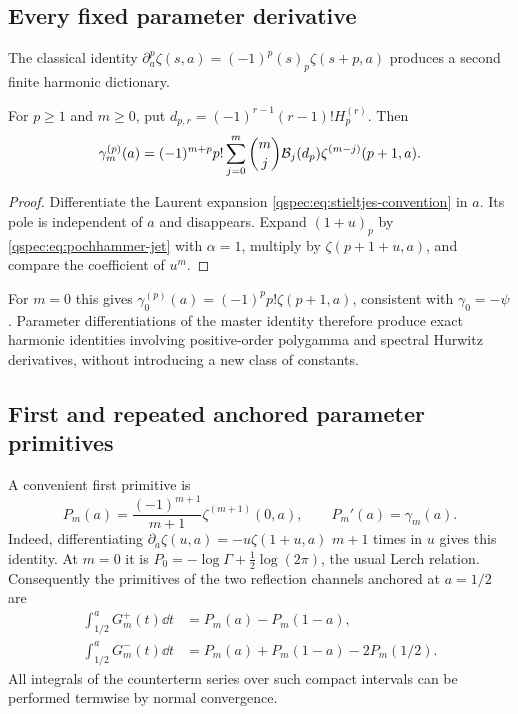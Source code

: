 \subsection{Every fixed parameter derivative}
The classical identity
$\partial_a^p\zeta(s,a)=(-1)^p(s)_p\zeta(s+p,a)$ \cite{hurwitz}
produces a second finite harmonic dictionary.

\begin{proposition}\label{qspec:prop:parameter-derivatives}
For $p\ge1$ and $m\ge0$, put
$d_{p,r}=(-1)^{r-1}(r-1)!H_p^{(r)}$. Then
\begin{equation}\label{qspec:eq:stieltjes-derivative}
\gamma_m^{(p)}(a)=(-1)^{m+p}p!
\sum_{j=0}^m\binom mj\mathcal B_j(d_p)
\zeta^{(m-j)}(p+1,a).
\end{equation}
\end{proposition}
\begin{proof}
Differentiate the Laurent expansion
\eqref{qspec:eq:stieltjes-convention} in $a$. Its pole is independent of
$a$ and disappears. Expand $(1+u)_p$ by
\eqref{qspec:eq:pochhammer-jet} with $\alpha=1$, multiply by
$\zeta(p+1+u,a)$, and compare the coefficient of $u^m$.
\end{proof}
For $m=0$ this gives $\gamma_0^{(p)}(a)=(-1)^pp!\zeta(p+1,a)$,
consistent with $\gamma_0=-\psi$. Parameter differentiations of the
master identity therefore produce exact harmonic identities involving
positive-order polygamma and spectral Hurwitz derivatives, without
introducing a new class of constants.

\subsection{First and repeated anchored parameter primitives}
A convenient first primitive is
\begin{equation}\label{qspec:eq:Pprimitive}
P_m(a)=\frac{(-1)^{m+1}}{m+1}\zeta^{(m+1)}(0,a),
\qquad P_m'(a)=\gamma_m(a).
\end{equation}
Indeed, differentiating $\partial_a\zeta(u,a)=-u\zeta(1+u,a)$
$m+1$ times in $u$ gives this identity. At $m=0$ it is
$P_0=-\log\Gamma+\tfrac12\log(2\pi)$, the usual Lerch relation.
Consequently the primitives of the two reflection channels anchored at
$a=1/2$ are
\begin{align}
\int_{1/2}^a G_m^+(t)\dd t&=P_m(a)-P_m(1-a),\label{qspec:eq:plus-primitive}\\
\int_{1/2}^a G_m^-(t)\dd t&=P_m(a)+P_m(1-a)-2P_m(1/2).
\label{qspec:eq:minus-primitive}
\end{align}
All integrals of the counterterm series over such compact intervals can
be performed termwise by normal convergence.

